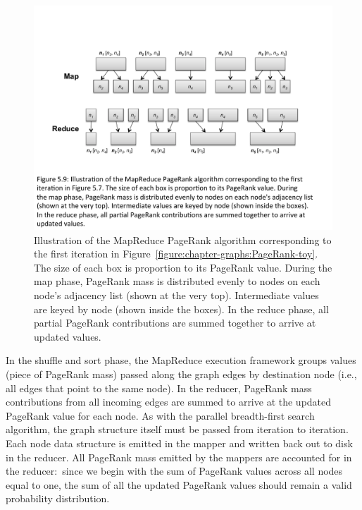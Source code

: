 \begin{figure}[t]
\begin{center}
\includegraphics[scale=0.55]{figures/fig-ch5-MapReduce-example.pdf}
\end{center}
\caption{Illustration of the MapReduce PageRank algorithm
  corresponding to the first iteration in
  Figure~\ref{figure:chapter-graphs:PageRank-toy}.  The size of each
  box is proportion to its PageRank value.  During the map phase,
  PageRank mass is distributed evenly to nodes on each node's
  adjacency list (shown at the very top).  Intermediate values are
  keyed by node (shown inside the boxes).  In the reduce phase, all
  partial PageRank contributions are summed together to arrive at
  updated values.}
\label{figure:chapter-graphs:PageRank-MapReduce-example}
\end{figure}

In the shuffle and sort phase, the MapReduce execution framework
groups values (piece of PageRank mass) passed along the graph edges by
destination node (i.e., all edges that point to the same node).  In
the reducer, PageRank mass contributions from all incoming edges are
summed to arrive at the updated PageRank value for each node.  As with
the parallel breadth-first search algorithm, the graph structure
itself must be passed from iteration to iteration.  Each node data
structure is emitted in the mapper and written back out to disk in the
reducer.  All PageRank mass emitted by the mappers are accounted for
in the reducer:\ since we begin with the sum of PageRank values across
all nodes equal to one, the sum of all the updated PageRank values
should remain a valid probability distribution.

